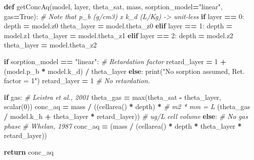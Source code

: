 \documentclass[]{article}
\newenvironment{Shaded}{\begin{snugshade}}{\end{snugshade}}
\newcommand{\KeywordTok}[1]{\textcolor[rgb]{0.13,0.29,0.53}{\textbf{{#1}}}}
\newcommand{\DecValTok}[1]{\textcolor[rgb]{0.00,0.00,0.81}{{#1}}}
\newcommand{\StringTok}[1]{\textcolor[rgb]{0.31,0.60,0.02}{{#1}}}
\newcommand{\CommentTok}[1]{\textcolor[rgb]{0.56,0.35,0.01}{\textit{{#1}}}}
\newcommand{\VariableTok}[1]{\textcolor[rgb]{0.00,0.00,0.00}{{#1}}}
\newcommand{\ControlFlowTok}[1]{\textcolor[rgb]{0.13,0.29,0.53}{\textbf{{#1}}}}
\newcommand{\OperatorTok}[1]{\textcolor[rgb]{0.81,0.36,0.00}{\textbf{{#1}}}}
\newcommand{\BuiltInTok}[1]{{#1}}
\newcommand{\NormalTok}[1]{{#1}}
\begin{document}
\begin{Shaded}
\begin{Highlighting}[]

\KeywordTok{def} \NormalTok{getConcAq(model, layer, theta_sat, mass,}
              \NormalTok{sorption_model}\OperatorTok{=}\StringTok{"linear"}\NormalTok{, gas}\OperatorTok{=}\VariableTok{True}\NormalTok{):}
    \CommentTok{# Note that p_b (g/cm3) x k_d (L/Kg) -> unit-less}
    \ControlFlowTok{if} \NormalTok{layer }\OperatorTok{==} \DecValTok{0}\NormalTok{:}
        \NormalTok{depth }\OperatorTok{=} \NormalTok{model.z0}
        \NormalTok{theta_layer }\OperatorTok{=} \NormalTok{model.theta_z0}
    \ControlFlowTok{elif} \NormalTok{layer }\OperatorTok{==} \DecValTok{1}\NormalTok{:}
        \NormalTok{depth }\OperatorTok{=} \NormalTok{model.z1}
        \NormalTok{theta_layer }\OperatorTok{=} \NormalTok{model.theta_z1}
    \ControlFlowTok{elif} \NormalTok{layer }\OperatorTok{==} \DecValTok{2}\NormalTok{:}
        \NormalTok{depth }\OperatorTok{=} \NormalTok{model.z2}
        \NormalTok{theta_layer }\OperatorTok{=} \NormalTok{model.theta_z2}

    \ControlFlowTok{if} \NormalTok{sorption_model }\OperatorTok{==} \StringTok{"linear"}\NormalTok{:}
        \CommentTok{# Retardation factor}
        \NormalTok{retard_layer }\OperatorTok{=} \DecValTok{1} \OperatorTok{+} \NormalTok{(model.p_b }\OperatorTok{*} \NormalTok{model.k_d) }\OperatorTok{/} \NormalTok{theta_layer}
    \ControlFlowTok{else}\NormalTok{:}
        \BuiltInTok{print}\NormalTok{(}\StringTok{"No sorption assumed, Ret. factor = 1"}\NormalTok{)}
        \NormalTok{retard_layer }\OperatorTok{=} \DecValTok{1}  \CommentTok{# No retardation.}

    \ControlFlowTok{if} \NormalTok{gas:  }\CommentTok{# Leistra et al., 2001}
        \NormalTok{theta_gas }\OperatorTok{=} \BuiltInTok{max}\NormalTok{(theta_sat }\OperatorTok{-} \NormalTok{theta_layer, scalar(}\DecValTok{0}\NormalTok{))}
        \NormalTok{conc_aq }\OperatorTok{=} \NormalTok{mass }\OperatorTok{/} \NormalTok{((cellarea() }\OperatorTok{*} \NormalTok{depth) }\OperatorTok{*}  \CommentTok{# m2 * mm = L}
                          \NormalTok{(theta_gas }\OperatorTok{/} \NormalTok{model.k_h }\OperatorTok{+}
                           \NormalTok{theta_layer }\OperatorTok{*} \NormalTok{retard_layer))  }\CommentTok{# ug/L cell volume}
    \ControlFlowTok{else}\NormalTok{:  }\CommentTok{# No gas phase}
        \CommentTok{# Whelan, 1987}
        \NormalTok{conc_aq }\OperatorTok{=} \NormalTok{(mass }\OperatorTok{/} \NormalTok{(cellarea() }\OperatorTok{*} \NormalTok{depth }\OperatorTok{*} \NormalTok{theta_layer }\OperatorTok{*} \NormalTok{retard_layer)) }

    \ControlFlowTok{return} \NormalTok{conc_aq}
\end{Highlighting}
\end{Shaded}
\end{document}
